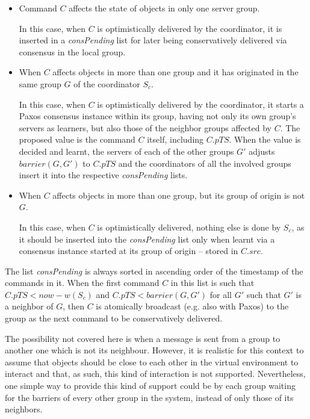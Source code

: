 \documentclass[times, 10pt]{article}
\begin{document}
\begin{itemize}
  \item Command $C$ affects the state of objects in only one server group.
  
  In this case, when $C$ is optimistically delivered by the coordinator, it is inserted in a \textit{consPending} list for later being conservatively delivered via consensus in the local group.

  \item When $C$ affects objects in more than one group and it has originated in the same group $G$ of the coordinator $S_c$.
  
  In this case, when $C$ is optimistically delivered by the coordinator, it starts a Paxos consensus instance within its group, having not only its own group's servers as learners, but also those of the neighbor groups affected by $C$. The proposed value is the command $C$ itself, including $C.pTS$. When the value is decided and learnt, the servers of each of the other groups $G'$ adjusts $barrier(G, G')$ to $C.pTS$ and the coordinators of all the involved groups insert it into the respective \textit{consPending} lists. 
  
  \item When $C$ affects objects in more than one group, but its group of origin is not $G$.
  
  In this case, when $C$ is optimistically delivered, nothing else is done by $S_c$, as it should be inserted into the \textit{consPending} list only when learnt via a consensus instance started at its group of origin -- stored in $C.src$.
\end{itemize}

The list \textit{consPending} is always sorted in ascending order of the timestamp of the commands in it. When the first command $C$ in this list is such that $C.pTS < now - w(S_c)$ and $C.pTS < barrier(G, G')$ for all $G'$ such that $G'$ is a neighbor of $G$, then $C$ is atomically broadcast (e.g. also with Paxos) to the group as the next command to be conservatively delivered. 

The possibility not covered here is when a message is sent from a group to another one which is not its neighbour. However, it is realistic for this context to assume that objects should be close to each other in the virtual environment to interact and that, as such, this kind of interaction is not supported. Nevertheless, one simple way to provide this kind of support could be by each group waiting for the barriers of every other group in the system, instead of only those of its neighbors.
\end{document}
